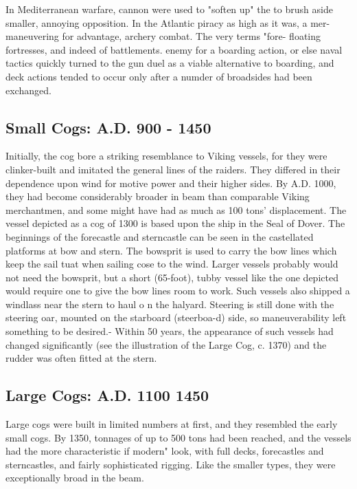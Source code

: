 \documentclass{article}
\begin{document}
\begin{multicols}{2}
In Mediterranean warfare, cannon were used to "soften up" the to brush
aside smaller, annoying opposition. In the Atlantic piracy as high as
it was, a mer- maneuvering for advantage, archery combat.  The very
terms "fore- floating fortresses, and indeed of battlements.
enemy for a boarding action, or else naval tactics quickly turned to
the gun duel as a viable alternative to boarding, and deck actions
tended to occur only after a numder of broadsides had been exchanged.

\subsection{Small Cogs:  A.D. 900 - 1450}

Initially, the cog bore a striking resemblance to Viking vessels, for
they were clinker-built and imitated the general lines of the raiders.
They differed in their dependence upon wind for motive power and their
higher sides.  By A.D. 1000, they had become considerably broader in
beam than comparable Viking merchantmen, and some might have had as
much as 100 tons' displacement.  The vessel depicted as a cog of 1300
is based upon the ship in the Seal of Dover.  The beginnings of the
forecastle and sterncastle can be seen in the castellated platforms at
bow and stern.  The bowsprit is used to carry the bow lines which keep
the sail tuat when sailing cose to the wind.  Larger vessels probably
would not need the bowsprit, but a short (65-foot), tubby vessel like
the one depicted would require one to give the bow lines room to work.
Such vessels also shipped a windlass near the stern to haul o n the
halyard.  Steering is still done with the steering oar, mounted on the
starboard (steerboa-d) side, so maneuverability left something to be
desired.- Within 50 years, the appearance of such vessels had changed
significantly (see the illustration of the Large Cog, c. 1370) and the
rudder was often fitted at the stern.

\subsection{Large Cogs:  A.D. 1100   1450}

Large cogs were built in limited numbers at first, and they resembled
the early small cogs.  By 1350, tonnages of up to 500 tons had been
reached, and the vessels had the more characteristic if modern" look,
with full decks, forecastles and sterncastles, and fairly
sophisticated rigging.  Like the smaller types, they were
exceptionally broad in the beam.


\end{multicols}
\end{document}
